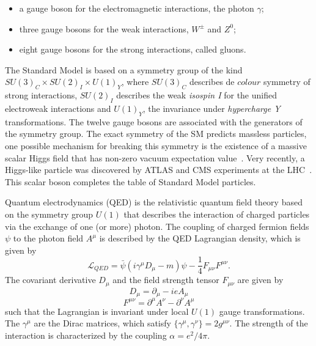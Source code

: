 \begin{itemize}\addtolength{\itemsep}{-0.4\baselineskip}
\item
a gauge boson for the electromagnetic interactions, the photon $\gamma$; 
\item
three gauge bosons for the weak interactions, $W^{\pm}$ and $Z^0$;
\item
eight gauge bosons for the strong interactions, called gluons. 
\end{itemize}


The Standard Model is based on a symmetry group of the kind $SU(3)_C \times SU(2)_I \times U(1)_Y$, where $SU(3)_C$ describes de $colour$ symmetry of strong interactions, $SU(2)_I$ describes the weak \emph{isospin I} for the unified electroweak interactions and $U(1)_Y$, the invariance under \emph{hypercharge Y} transformations. The twelve gauge bosons are associated with the generators of the symmetry group. The exact symmetry of the SM predicts massless particles, one possible mechanism for breaking this symmetry is the existence of a massive scalar Higgs field that has non-zero vacuum expectation value~\cite{Higgs1964132}. Very recently, a Higgs-like particle was discovered by ATLAS and CMS experiments at the LHC~\cite{ATLASHiggs}. This scalar boson completes the table of Standard Model particles. %


Quantum electrodynamics (QED) is the relativistic quantum field theory based on the symmetry group $U(1)$ that describes the interaction of charged particles via the exchange of one (or more) photon. %
The coupling of charged fermion fields $\psi$ to the photon field $A^{\mu}$ is described by the QED Lagrangian density, which is given by
%
\begin{equation}
\mathcal{L}_{QED} = \bar{\psi} (i\gamma^{\mu}D_{\mu} - m)\psi- \frac{1}{4} F_{\mu\nu}F^{\mu\nu}.
\end{equation}
%
The covariant derivative $D_{\mu}$ and the field strength tensor $F_{\mu\nu}$ are given by
%
\begin{equation}
D_{\mu} = \partial_{\mu} - i e A_{\mu} 
\end{equation}
\begin{equation}
F^{\mu\nu} = \partial^{\mu} A^{\nu} -  \partial^{\nu} A^{\mu}
\end{equation}
%
such that the Lagrangian is invariant under local $U(1)$ gauge transformations. The $\gamma^{\mu}$ are the Dirac matrices, which satisfy  $ \{ \gamma^{\mu},\gamma^{\nu} \} = 2g^{\mu\nu}$. The strength of the interaction is characterized by the coupling $\alpha = e^2/4\pi$.

